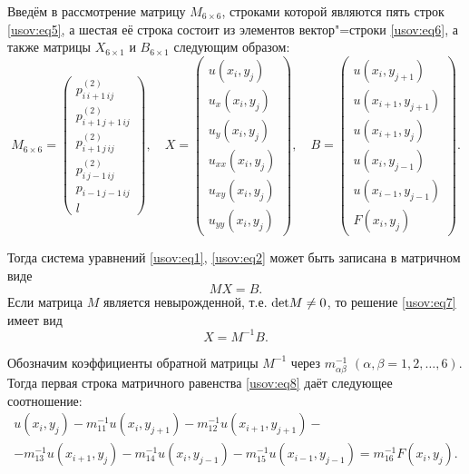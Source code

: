 Введём в рассмотрение матрицу $M_{6\times 6}$, строками которой
являются пять строк \eqref{usov:eq5}, а шестая её строка состоит
из элементов вектор"=строки \eqref{usov:eq6}, а также матрицы
$X_{6 \times 1}$ и $B_{6 \times 1}$ следующим образом:
$$
M_{6\times 6}=\begin{pmatrix} p_{i \, i+1 \, ij}^{(2)}\\
 p_{i+1 \, j+1 \, ij}^{(2)}\\
 p_{i+1 \, j \, ij}^{(2)}\\
 p_{i \, j-1 \, ij}^{(2)}\\
 p_{i-1 \, j-1 \, ij}\\
 l
\end{pmatrix}, \quad
 X=\begin{pmatrix}
u(x_i,y_j)\\
u_x(x_i,y_j)\\
u_y(x_i,y_j)\\
u_{xx}(x_i,y_j)\\
u_{xy}(x_i,y_j)\\
u_{yy}(x_i,y_j)
\end{pmatrix}, \quad
B=\begin{pmatrix}
u(x_i,y_{j+1})\\
u(x_{i+1},y_{j+1})\\
u(x_{i+1},y_j)\\
u(x_i,y_{j-1})\\
u(x_{i-1},y_{j-1})\\
F(x_i,y_j)
\end{pmatrix}.
$$

Тогда система уравнений \eqref{usov:eq1}, \eqref{usov:eq2} может
быть записана в матричном виде
\begin{equation}
\label{usov:eq7} MX=B.
\end{equation}
Если матрица $M$ является невырожденной, т.е. ${\rm det} M \neq
0$, то решение \eqref{usov:eq7} имеет вид
\begin{equation}
\label{usov:eq8} X=M^{-1} B.
\end{equation}

Обозначим коэффициенты обратной матрицы $M^{-1}$ через
$m_{\alpha\beta}^{-1}$ $(\alpha,\beta=1, 2,\ldots, 6)$. Тогда первая
строка матричного равенства \eqref{usov:eq8} даёт следующее
соотношение:
\begin{multline}
\label{usov:eq9} u(x_i,
y_j)-m_{11}^{-1}u(x_i,y_{j+1})-m_{12}^{-1}u(x_{i+1},y_{j+1})-
\\ - m_{13}^{-1}u(x_{i+1},y_j)
-m_{14}^{-1}u(x_i,y_{j-1})-m_{15}^{-1}u(x_{i-1},y_{j-1})=m_{16}^{-1}F(x_i,y_j).
\end{multline}

